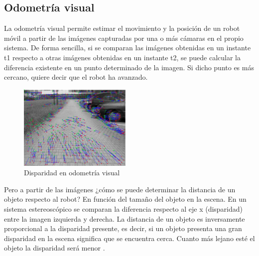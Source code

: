 



\subsection{Odometría visual}
La odometría visual permite estimar el movimiento y la posición de un robot
móvil a partir de las imágenes capturadas por una o más cámaras en el propio
sistema. De forma sencilla, si se comparan las imágenes obtenidas en un instante
t1 respecto a otras imágenes obtenidas en un instante t2, se puede calcular la
diferencia existente en un punto determinado de la imagen. Si dicho punto es más
cercano, quiere decir que el robot ha avanzado.

\begin{figure}
  \vspace{-20pt}
  \begin{center}
    \includegraphics[width=0.48\textwidth]{images/cap2/OdometriaVisual.eps}
  \end{center}
  \vspace{-20pt}
  \caption{Disparidad en odometría visual}
  \vspace{-10pt}
  \label{fig:OdometriaVisual}
\end{figure}

Pero a partir de las imágenes ¿cómo se puede determinar la distancia de un
objeto respecto al robot? En función del tamaño del objeto en la escena. En un
sistema estereoscópico se comparan la diferencia respecto al eje x (disparidad)
entre la imagen izquierda y derecha. La distancia de un objeto es inversamente
proporcional a la disparidad presente, es decir, si un objeto presenta una gran
disparidad en la escena significa que se encuentra cerca. Cuanto más lejano esté
el objeto la disparidad será menor \cite{OdometriaVisual}.

